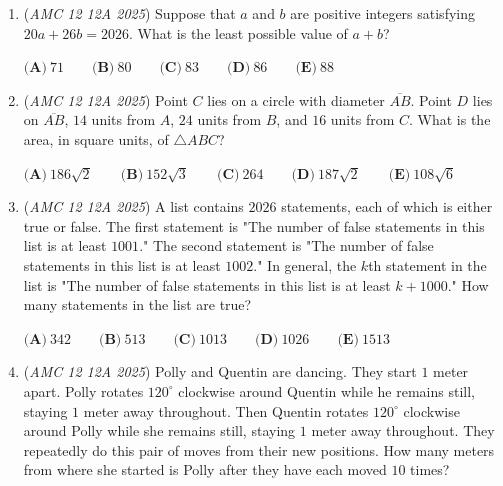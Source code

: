 \begin{enumerate}
 $\textbf{(A)}\   \frac{1}{4}  \qquad                 \textbf{(B)}\   \frac{1}{2}  \qquad                 \textbf{(C)}\   \frac{1}{2}\sqrt{2}  \qquad                 \textbf{(D)}\   \frac{3}{4}  \qquad                 \textbf{(E)}\   \sqrt{2}$


	\item (\textit{AMC 12 12A 2025}) Suppose that $a$ and $b$ are positive integers satisfying $20a + 26b = 2026$. What is the least possible value of $a+b$?


 $\textbf{(A)}\   71  \qquad                 \textbf{(B)}\   80  \qquad                 \textbf{(C)}\   83  \qquad                 \textbf{(D)}\   86  \qquad                 \textbf{(E)}\   88$


	\item (\textit{AMC 12 12A 2025}) Point $C$ lies on a circle with diameter $\overline{AB}$. Point $D$ lies on $\overline{AB}$, $14$ units from $A$, $24$ units from $B$, and $16$ units from $C$. What is the area, in square units, of $\triangle ABC$?


 $\textbf{(A)}\   186\sqrt{2}  \qquad                 \textbf{(B)}\   152\sqrt{3}  \qquad                 \textbf{(C)}\   264  \qquad                 \textbf{(D)}\   187\sqrt{2}  \qquad                 \textbf{(E)}\   108\sqrt{6}$


	\item (\textit{AMC 12 12A 2025}) A list contains $2026$ statements, each of which is either true or false. The first statement is "The number of false statements in this list is at least $1001$." The second statement is "The number of false statements in this list is at least $1002$." In general, the $k$th statement in the list is "The number of false statements in this list is at least $k+1000$." How many statements in the list are true?


 $\textbf{(A)}\   342  \qquad                 \textbf{(B)}\   513  \qquad                 \textbf{(C)}\   1013  \qquad                 \textbf{(D)}\   1026  \qquad                 \textbf{(E)}\   1513$


	\item (\textit{AMC 12 12A 2025}) Polly and Quentin are dancing. They start $1$ meter apart. Polly rotates $120^{\circ}$ clockwise around Quentin while he remains still, staying $1$ meter away throughout. Then Quentin rotates $120^{\circ}$ clockwise around Polly while she remains still, staying $1$ meter away throughout. They repeatedly do this pair of moves from their new positions. How many meters from where she started is Polly after they have each moved $10$ times?



\end{enumerate}

